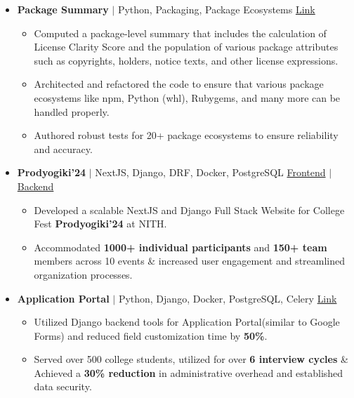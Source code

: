 \documentclass[legalpaper,10.5pt]{article}
\begin{document}
\begin{itemize}[leftmargin=*]
\item \textbf{Package Summary} $|$ Python, Packaging, Package Ecosystems  \hfill \href{https://github.com/aboutcode-org/scancode-toolkit}{Link}
{\small
\begin{itemize}[label=$\diamond$,itemsep=0pt]
    \item Computed a package-level summary that includes the calculation of License Clarity Score and the population of various package attributes such as copyrights, holders, notice texts, and other license expressions.
    \item Architected and refactored the code to ensure that various package ecosystems like npm, Python (whl), Rubygems, and many more can be handled properly.
    \item Authored robust tests for 20+ package ecosystems to ensure reliability and accuracy.
\end{itemize}
}
\item \textbf{Prodyogiki'24} $|$ NextJS, Django, DRF, Docker, PostgreSQL \hfill \href{https://github.com/istenith/prody-frontend}{Frontend} $|$ \href{https://github.com/istenith/prody-backend}{Backend}
{\small
\begin{itemize}[label=$\diamond$]
    \item Developed a scalable NextJS and Django Full Stack Website for College Fest \textbf{Prodyogiki'24} at NITH.
    \item Accommodated \textbf{1000+ individual participants} and \textbf{150+ team} members across 10 events \& increased user engagement and streamlined organization processes.
\end{itemize}
}
\item \textbf{Application Portal} $|$ Python, Django, Docker, PostgreSQL, Celery  \hfill \href{https://github.com/istenith/join.istenith.com}{Link}
{\small
\begin{itemize}[label=$\diamond$]
    \item Utilized Django backend tools for Application Portal(similar to Google Forms) and reduced field customization time by \textbf{50\%}.
    \item Served over 500 college students, utilized for over \textbf{6 interview cycles} \& Achieved a \textbf{30\% reduction} in administrative overhead and established data security.
\end{itemize}
}
\end{itemize}
\end{document}
